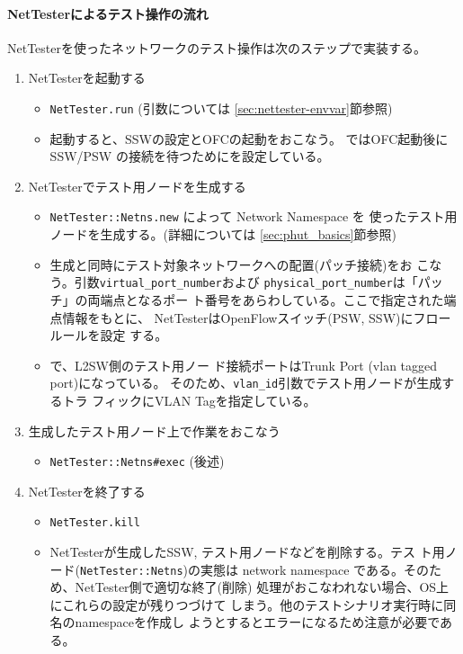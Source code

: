     \paragraph{NetTesterによるテスト操作の流れ}
NetTesterを使ったネットワークのテスト操作は次のステップで実装する。
\begin{enumerate}
 \item NetTesterを起動する
       \begin{itemize}
        \item \verb|NetTester.run| (引数については
              \ref{sec:nettester-envvar}節参照)
        \item 起動すると、SSWの設定とOFCの起動をおこなう。
              ではOFC起動後にSSW/PSW
              の接続を待つためにを設定している。
       \end{itemize}
 \item NetTesterでテスト用ノードを生成する
       \begin{itemize}
        \item \verb|NetTester::Netns.new| によって Network Namespace を
              使ったテスト用ノードを生成する。(詳細については
              \ref{sec:phut_basics}節参照)
        \item 生成と同時にテスト対象ネットワークへの配置(パッチ接続)をお
              こなう。引数\verb|virtual_port_number|および
              \verb|physical_port_number|は「パッチ」の両端点となるポー
              ト番号をあらわしている。ここで指定された端点情報をもとに、
              NetTesterはOpenFlowスイッチ(PSW, SSW)にフロールールを設定
              する。
        \item {}で、L2SW側のテスト用ノー
              ド接続ポートはTrunk Port (vlan tagged port)になっている。
              そのため、\verb|vlan_id|引数でテスト用ノードが生成するトラ
              フィックにVLAN Tagを指定している。
       \end{itemize}
 \item 生成したテスト用ノード上で作業をおこなう
       \begin{itemize}
        \item \verb|NetTester::Netns#exec| (後述)
       \end{itemize}
 \item NetTesterを終了する
       \begin{itemize}
        \item \verb|NetTester.kill|
        \item NetTesterが生成したSSW, テスト用ノードなどを削除する。テス
              ト用ノード(\verb|NetTester::Netns|)の実態は network
              namespace である。そのため、NetTester側で適切な終了(削除)
              処理がおこなわれない場合、OS上にこれらの設定が残りつづけて
              しまう。他のテストシナリオ実行時に同名のnamespaceを作成し
              ようとするとエラーになるため注意が必要である。
       \end{itemize}
\end{enumerate}

